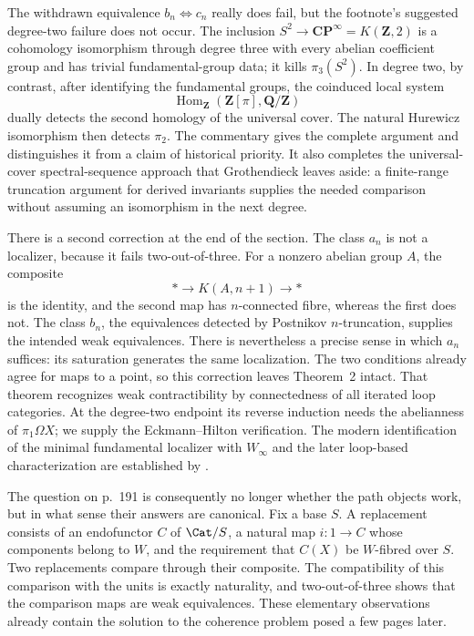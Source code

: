 The withdrawn equivalence $b_n\Leftrightarrow c_n$ really does fail, but the footnote's suggested degree-two failure does not occur. The inclusion $S^2\to\mathbf{CP}^{\infty}=K(\mathbf Z,2)$ is a cohomology isomorphism through degree three with every abelian coefficient group and has trivial fundamental-group data; it kills $\pi_3(S^2)$. In degree two, by contrast, after identifying the fundamental groups, the coinduced local system
\[
 \operatorname{Hom}_{\mathbf Z}(\mathbf Z[\pi],\mathbf Q/\mathbf Z)
\]
dually detects the second homology of the universal cover. The natural Hurewicz isomorphism then detects $\pi_2$. The commentary gives the complete argument and distinguishes it from a claim of historical priority. It also completes the universal-cover spectral-sequence approach that Grothendieck leaves aside: a finite-range truncation argument for derived invariants supplies the needed comparison without assuming an isomorphism in the next degree.

There is a second correction at the end of the section. The class $a_n$ is not a localizer, because it fails two-out-of-three. For a nonzero abelian group $A$, the composite
\[
 *\longrightarrow K(A,n+1)\longrightarrow *
\]
is the identity, and the second map has $n$-connected fibre, whereas the first does not. The class $b_n$, the equivalences detected by Postnikov $n$-truncation, supplies the intended weak equivalences. There is nevertheless a precise sense in which $a_n$ suffices: its saturation generates the same localization. The two conditions already agree for maps to a point, so this correction leaves Theorem~2 intact. That theorem recognizes weak contractibility by connectedness of all iterated loop categories. At the degree-two endpoint its reverse induction needs the abelianness of $\pi_1\Omega X$; we supply the Eckmann--Hilton verification. The modern identification of the minimal fundamental localizer with $W_\infty$ and the later loop-based characterization are established by \citet[Theorems~2.2.11 and 2.3.6]{Cisinski2004Minimal}.

The question on p.~191 is consequently no longer whether the path objects work, but in what sense their answers are canonical. Fix a base $S$. A replacement consists of an endofunctor $C$ of $\Cat/S$, a natural map $i:1\to C$ whose components belong to $W$, and the requirement that $C(X)$ be $W$-fibred over $S$. Two replacements compare through their composite. The compatibility of this comparison with the units is exactly naturality, and two-out-of-three shows that the comparison maps are weak equivalences. These elementary observations already contain the solution to the coherence problem posed a few pages later.

